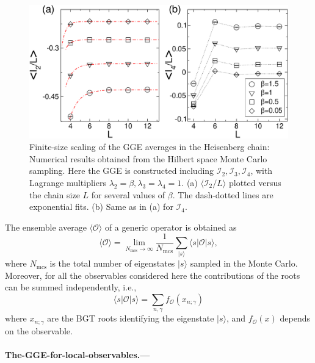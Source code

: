\documentclass[twocolumn,superscriptaddress,prb,10pt]{revtex4-1}
\begin{document}
%
\begin{figure}[t]
\includegraphics*[width=0.93\linewidth]{./draft_figs/fig3}
\caption{Finite-size scaling of the GGE averages in the Heisenberg chain: Numerical results 
 obtained from the Hilbert space Monte Carlo sampling. Here the GGE is constructed including 
 ${\mathcal I}_2, {\mathcal I}_3, {\mathcal I}_4$, with Lagrange multipliers $\lambda_2=\beta,
 \lambda_3=\lambda_4=1$. (a) $\langle {\mathcal I}_2/L\rangle$ plotted versus the chain size 
 $L$ for several values of $\beta$. The dash-dotted lines are exponential fits. (b) Same as 
 in (a) for ${\mathcal I}_4$.
}
\label{fig2}
\end{figure}
%
The ensemble average $\langle{\mathcal O}\rangle$ of a generic operator is obtained as  
%
\begin{equation}
\label{gge-mc}
\langle{\mathcal O}\rangle=\lim\limits_{N_\textrm{mcs}\to\infty}\frac{1}
{N_\textrm{mcs}}\sum\limits_{|s\rangle}\langle s|{\mathcal O}
|s\rangle,
\end{equation}
%
where $N_{\textrm{mcs}}$ is the total number of eigenstates $|s\rangle$ sampled in 
the Monte Carlo. Moreover, for all the observables considered here the contributions 
of the roots can be summed independently, i.e., 
%
\begin{equation}
\label{gge-mc-1}
\langle s|{\mathcal O}|s\rangle=\sum\limits_{n,\gamma}f_{{\mathcal O}}(x_{n;\gamma})
\end{equation}
%
where $x_{n;\gamma}$ are the BGT roots identifying the eigenstate $|s\rangle$, and 
$f_{{\mathcal O}}(x)$ depends on the observable. 


\paragraph*{The-GGE-for-local-observables.---} 
\end{document}
